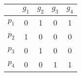 \documentclass[tikz]{standalone}
\begin{document}
    \begin{table}
        \begin{tabular}{c|cccc}
                  & $g_1$ & $g_2$ & $g_3$ & $g_4$ \\
            \hline
            $p_1$ & 0 & 1 & 0 & 1 \\
            $p_2$ & 1 & 0 & 0 & 0 \\
            $p_3$ & 0 & 1 & 0 & 0 \\
            $p_4$ & 0 & 0 & 1 & 1 \\
        \end{tabular}
    \end{table}
\end{document}
